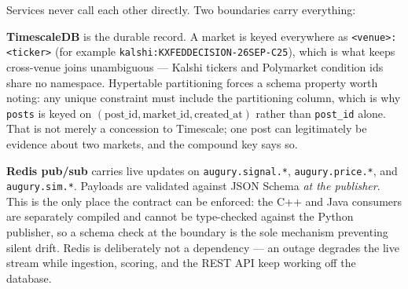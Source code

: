 \documentclass[11pt]{article}
\newcommand{\code}[1]{\texttt{\small #1}}
\begin{document}
Services never call each other directly. Two boundaries carry everything:

\textbf{TimescaleDB} is the durable record. A market is keyed everywhere as
\code{<venue>:<ticker>} (for example \code{kalshi:KXFEDDECISION-26SEP-C25}),
which is what keeps cross-venue joins unambiguous --- Kalshi tickers and
Polymarket condition ids share no namespace. Hypertable partitioning forces a
schema property worth noting: any unique constraint must include the
partitioning column, which is why \code{posts} is keyed on
$(\text{post\_id}, \text{market\_id}, \text{created\_at})$ rather than
\code{post\_id} alone. That is not merely a concession to Timescale; one post
can legitimately be evidence about two markets, and the compound key says so.

\textbf{Redis pub/sub} carries live updates on \code{augury.signal.*},
\code{augury.price.*}, and \code{augury.sim.*}. Payloads are validated against
JSON Schema \emph{at the publisher}. This is the only place the contract can be
enforced: the C++ and Java consumers are separately compiled and cannot be
type-checked against the Python publisher, so a schema check at the boundary is
the sole mechanism preventing silent drift. Redis is deliberately not a
dependency --- an outage degrades the live stream while ingestion, scoring, and
the REST API keep working off the database.
\end{document}
